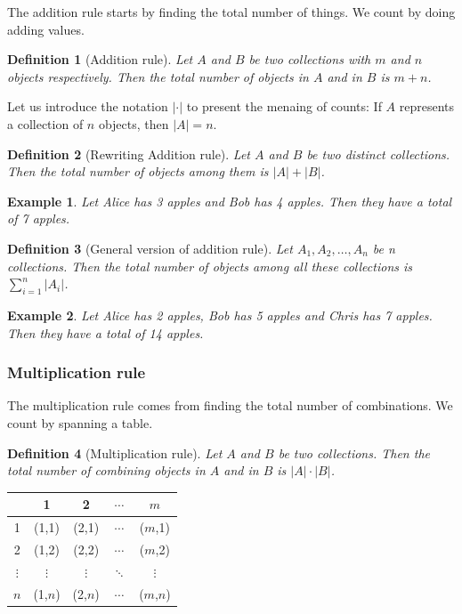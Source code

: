 \documentclass[12pt]{article}
\newtheorem{definition}{Definition}[section]
\newtheorem*{example}{Example}
\begin{document}
    The addition rule starts by finding the total number of things. We count by doing adding values.

    \begin{definition}[Addition rule]
        Let $A$ and $B$ be two collections with $m$ and $n$ objects respectively. Then the total number of objects in $A$ and in $B$ is $m+n$.
    \end{definition}

    Let us introduce the notation $|\cdot|$ to present the menaing of counts: If $A$ represents a collection of $n$ objects, then $|A|=n$.

    \begin{definition}[Rewriting Addition rule]
        Let $A$ and $B$ be two distinct collections. Then the total number of objects among them is $|A|+|B|$.
    \end{definition}

    \begin{example}
        Let Alice has 3 apples and Bob has 4 apples. Then they have a total of 7 apples.
    \end{example}

    \begin{definition}[General version of addition rule]
        Let $A_1,A_2,\dots,A_n$ be n collections. Then the total number of objects among all these collections is $\displaystyle \sum_{i=1}^{n}|A_i|$. 
    \end{definition}

    \begin{example}
        Let Alice has 2 apples, Bob has 5 apples and Chris has 7 apples. Then they have a total of 14 apples.
    \end{example}

    \subsubsection*{Multiplication rule}

    The multiplication rule comes from finding the total number of combinations. We count by spanning a table.

    \begin{definition}[Multiplication rule]
        Let $A$ and $B$ be two collections. Then the total number of combining objects in $A$ and in $B$ is $|A|\cdot |B|$.
    \end{definition}

    \begin{center}
        \begin{tabular}{|c|c|c|c|c|}
            \hline
            &1&2&$\cdots$&$m$\\
            \hline
            1&(1,1)&(2,1)&$\cdots$&($m$,1)\\
            \hline
            2&(1,2)&(2,2)&$\cdots$&($m$,2)\\
            \hline
            $\vdots$&$\vdots$&$\vdots$&$\ddots$&$\vdots$\\
            \hline
            $n$&(1,$n$)&(2,$n$)&$\cdots$&($m$,$n$)\\
            \hline
        \end{tabular}
    \end{center}
\end{document}
